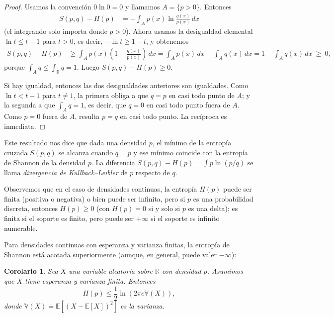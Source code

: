 \documentclass[12pt, a4paper]{amsbook}
\newcommand{\R}{{\mathbb R}}
\newcommand{\E}{{\mathbb E}}
\newcommand{\V}{{\mathbb V}}
\newtheorem{cor}[teo]{Corolario}
\theoremstyle{remark}
\theoremstyle{definition}
\numberwithin{section}{chapter}
\numberwithin{subsection}{section}
\numberwithin{equation}{section}
\numberwithin{figure}{chapter}
\begin{document}
\begin{proof}
Usamos la convención $0\ln0=0$ y llamamos $A=\{p>0\}$. Entonces
\begin{align*}
S(p, q) - H(p) &= -\int_A p(x)\ln \frac{q(x)}{p(x)}\, dx
\end{align*}
(el integrando solo importa donde $p>0$). Ahora usamos la desigualdad elemental $\ln t \le t-1$ para $t>0$, es decir, $-\ln t\ge 1-t$, y obtenemos
\begin{align*}
S(p, q) - H(p) &\ge \int_A p(x) \left(1-\frac{q(x)}{p(x)}\right)\, dx
= \int_A p(x)\, dx - \int_A q(x)\, dx = 1 - \int_A q(x)\, dx\ \ge\ 0,
\end{align*}
porque $\int_A q\le\int_\R q=1$. Luego $S(p, q)-H(p)\ge 0$.

Si hay igualdad, entonces las dos desigualdades anteriores son igualdades. Como $\ln t<t-1$ para $t\neq1$, la primera obliga a que $q=p$ en casi todo punto de $A$; y la segunda a que $\int_A q=1$, es decir, que $q=0$ en casi todo punto fuera de $A$. Como $p=0$ fuera de $A$, resulta $p=q$ en casi todo punto. La recíproca es inmediata.
\end{proof}

Este resultado nos dice que dada una densidad $p$, el mínimo de la entropía cruzada $S(p, q)$ se alcanza cuando $q=p$ y ese mínimo coincide con la entropía de Shannon de la densidad $p$. La diferencia $S(p,q)-H(p)=\int p\ln(p/q)$ se llama {\em divergencia de Kullback--Leibler} de $p$ respecto de $q$.

Observemos que en el caso de densidades continuas, la entropía $H(p)$ puede ser finita (positiva o negativa) o bien puede ser infinita, pero si $p$ es una probabilidad discreta, entonces $H(p)\ge0$ (con $H(p)=0$ si y solo si $p$ es una delta); es finita si el soporte es finito, pero puede ser $+\infty$ si el soporte es infinito numerable.

Para densidades continuas con esperanza y varianza finitas, la entropía de Shannon está acotada superiormente (aunque, en general, puede valer $-\infty$):
\begin{cor}
Sea $X$ una variable aleatoria sobre $\R$ con densidad $p$. Asumimos que $X$ tiene esperanza y varianza finita. Entonces
$$
H(p)\le \frac12 \ln(2\pi e \V(X)),
$$
donde $\V(X) = \E[(X-\E[X])^2]$ es la varianza.
\end{cor}
\end{document}
